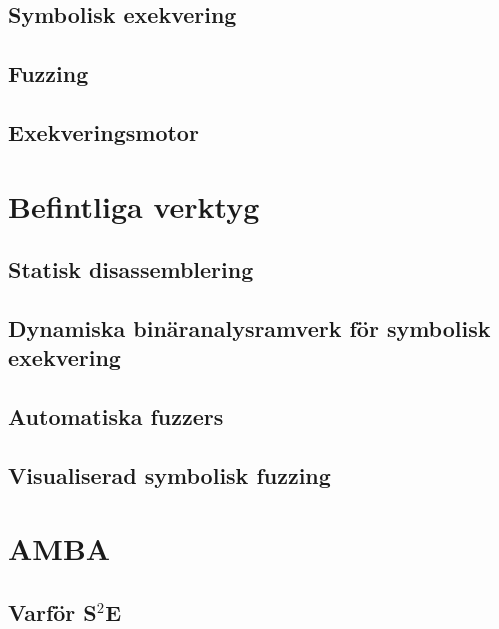 \documentclass[12pt,a4paper]{report}
\newcommand{\stoe}{S$^2$E\xspace}
\begin{document}
\section{Symbolisk exekvering}\label{sec:symbolic_execution}

\section{Fuzzing}

\section{Exekveringsmotor}


\cleardoublepage
\chapter{Befintliga verktyg}\label{chap:befintliga_verktyg}

\section{Statisk disassemblering}\label{sec:befintliga-disasm}

\section{Dynamiska binäranalysramverk för symbolisk exekvering}\label{sec:befintliga-ramverk}

\section{Automatiska fuzzers}\label{sec:befintliga-automatisk}

\section{Visualiserad symbolisk fuzzing}\label{sec:befintliga-visualiserad}


\cleardoublepage
\chapter{AMBA}\label{chap:amba}

\section{Varför \stoe{}}

\end{document}
